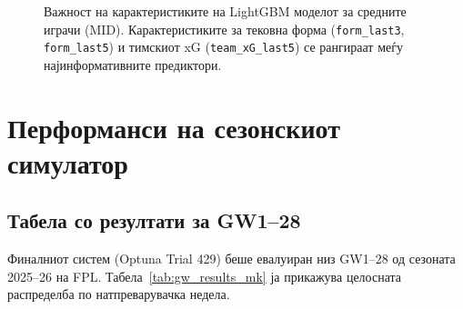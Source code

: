 \begin{figure}[h]
\centering
{}
\caption{Важност на карактеристиките на LightGBM моделот за средните играчи (MID). Карактеристиките за тековна форма (\texttt{form\_last3}, \texttt{form\_last5}) и тимскиот xG (\texttt{team\_xG\_last5}) се рангираат меѓу најинформативните предиктори.}
\label{fig:feature_importance_mk}
\end{figure}

\section{Перформанси на сезонскиот симулатор}

\subsection{Табела со резултати за GW1--28}

Финалниот систем (Optuna Trial 429) беше евалуиран низ GW1--28 од сезоната 2025--26 на FPL. Табела~\ref{tab:gw_results_mk} ја прикажува целосната распределба по натпреварувачка недела.

